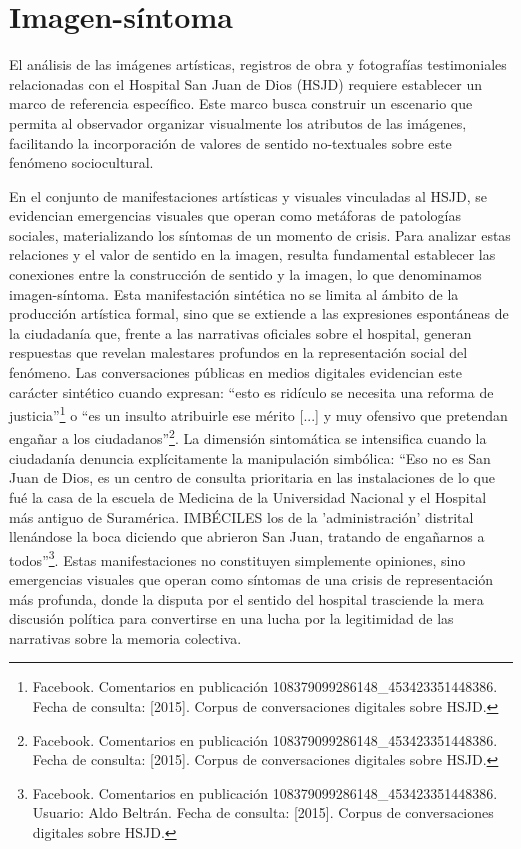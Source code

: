\section{Imagen-síntoma}

El análisis de las imágenes artísticas, registros de obra y fotografías testimoniales relacionadas con el Hospital San Juan de Dios (HSJD) requiere establecer un marco de referencia específico. Este marco busca construir un escenario que permita al observador organizar visualmente los atributos de las imágenes, facilitando la incorporación de valores de sentido no-textuales sobre este fenómeno sociocultural.

En el conjunto de manifestaciones artísticas y visuales vinculadas al HSJD, se evidencian emergencias visuales que operan como metáforas de patologías sociales, materializando los síntomas de un momento de crisis. Para analizar estas relaciones y el valor de sentido en la imagen, resulta fundamental establecer las conexiones entre la construcción de sentido y la imagen, lo que denominamos imagen-síntoma. Esta manifestación sintética no se limita al ámbito de la producción artística formal, sino que se extiende a las expresiones espontáneas de la ciudadanía que, frente a las narrativas oficiales sobre el hospital, generan respuestas que revelan malestares profundos en la representación social del fenómeno. Las conversaciones públicas en medios digitales evidencian este carácter sintético cuando expresan: ``esto es ridículo se necesita una reforma de justicia''\footnote{Facebook. Comentarios en publicación 108379099286148\_453423351448386. Fecha de consulta: [2015]. Corpus de conversaciones digitales sobre HSJD.} o ``es un insulto atribuirle ese mérito [...] y muy ofensivo que pretendan engañar a los ciudadanos''\footnote{Facebook. Comentarios en publicación 108379099286148\_453423351448386. Fecha de consulta: [2015]. Corpus de conversaciones digitales sobre HSJD.}. La dimensión sintomática se intensifica cuando la ciudadanía denuncia explícitamente la manipulación simbólica: ``Eso no es San Juan de Dios, es un centro de consulta prioritaria en las instalaciones de lo que fué la casa de la escuela de Medicina de la Universidad Nacional y el Hospital más antiguo de Suramérica. IMBÉCILES los de la 'administración' distrital llenándose la boca diciendo que abrieron San Juan, tratando de engañarnos a todos''\footnote{Facebook. Comentarios en publicación 108379099286148\_453423351448386. Usuario: Aldo Beltrán. Fecha de consulta: [2015]. Corpus de conversaciones digitales sobre HSJD.}. Estas manifestaciones no constituyen simplemente opiniones, sino emergencias visuales que operan como síntomas de una crisis de representación más profunda, donde la disputa por el sentido del hospital trasciende la mera discusión política para convertirse en una lucha por la legitimidad de las narrativas sobre la memoria colectiva.

